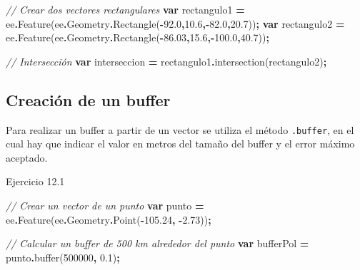 \documentclass[
  12pt,
  letterpaper,
  twoside]{book}
\newenvironment{Shaded}{\begin{snugshade}}{\end{snugshade}}
\newcommand{\AttributeTok}[1]{\textcolor[rgb]{0.77,0.63,0.00}{#1}}
\newcommand{\CommentTok}[1]{\textcolor[rgb]{0.56,0.35,0.01}{\textit{#1}}}
\newcommand{\DecValTok}[1]{\textcolor[rgb]{0.00,0.00,0.81}{#1}}
\newcommand{\FloatTok}[1]{\textcolor[rgb]{0.00,0.00,0.81}{#1}}
\newcommand{\FunctionTok}[1]{\textcolor[rgb]{0.00,0.00,0.00}{#1}}
\newcommand{\KeywordTok}[1]{\textcolor[rgb]{0.13,0.29,0.53}{\textbf{#1}}}
\newcommand{\NormalTok}[1]{#1}
\newcommand{\OperatorTok}[1]{\textcolor[rgb]{0.81,0.36,0.00}{\textbf{#1}}}
\begin{document}
\begin{Shaded}
\begin{Highlighting}[]
\CommentTok{// Crear dos vectores rectangulares}
\KeywordTok{var}\NormalTok{ rectangulo1 }\OperatorTok{=}\NormalTok{ ee}\OperatorTok{.}\FunctionTok{Feature}\NormalTok{(ee}\OperatorTok{.}\AttributeTok{Geometry}\OperatorTok{.}\FunctionTok{Rectangle}\NormalTok{(}\OperatorTok{{-}}\FloatTok{92.0}\OperatorTok{,}\FloatTok{10.6}\OperatorTok{,{-}}\FloatTok{82.0}\OperatorTok{,}\FloatTok{20.7}\NormalTok{))}\OperatorTok{;}
\KeywordTok{var}\NormalTok{ rectangulo2 }\OperatorTok{=}\NormalTok{ ee}\OperatorTok{.}\FunctionTok{Feature}\NormalTok{(ee}\OperatorTok{.}\AttributeTok{Geometry}\OperatorTok{.}\FunctionTok{Rectangle}\NormalTok{(}\OperatorTok{{-}}\FloatTok{86.03}\OperatorTok{,}\FloatTok{15.6}\OperatorTok{,{-}}\FloatTok{100.0}\OperatorTok{,}\FloatTok{40.7}\NormalTok{))}\OperatorTok{;}

\CommentTok{// Intersección}
\KeywordTok{var}\NormalTok{ interseccion }\OperatorTok{=}\NormalTok{ rectangulo1}\OperatorTok{.}\FunctionTok{intersection}\NormalTok{(rectangulo2)}\OperatorTok{;}
\end{Highlighting}
\end{Shaded}

\hypertarget{creaciuxf3n-de-un-buffer}{%
\subsection{Creación de un buffer}\label{creaciuxf3n-de-un-buffer}}

Para realizar un buffer a partir de un vector se utiliza el método \texttt{.buffer}, en el cual hay que indicar el valor en metros del tamaño del buffer y el error máximo aceptado.

Ejercicio 12.1

\begin{Shaded}
\begin{Highlighting}[]
\CommentTok{// Crear un vector de un  punto}
\KeywordTok{var}\NormalTok{ punto }\OperatorTok{=}\NormalTok{ ee}\OperatorTok{.}\FunctionTok{Feature}\NormalTok{(ee}\OperatorTok{.}\AttributeTok{Geometry}\OperatorTok{.}\FunctionTok{Point}\NormalTok{(}\OperatorTok{{-}}\FloatTok{105.24}\OperatorTok{,} \OperatorTok{{-}}\FloatTok{2.73}\NormalTok{))}\OperatorTok{;}

\CommentTok{// Calcular un buffer de 500 km alrededor del punto}
\KeywordTok{var}\NormalTok{ bufferPol }\OperatorTok{=}\NormalTok{ punto}\OperatorTok{.}\FunctionTok{buffer}\NormalTok{(}\DecValTok{500000}\OperatorTok{,} \FloatTok{0.1}\NormalTok{)}\OperatorTok{;}
\end{Highlighting}
\end{Shaded}
\end{document}

